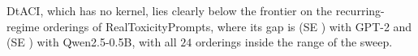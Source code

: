 DtACI, which has no kernel, lies clearly below the frontier on the recurring-regime orderings of RealToxicityPrompts, where its gap is \BwDtaciRecurGptTwo{} (SE \BwDtaciRecurGptTwoSE{}) with GPT-2 and \BwDtaciRecurQwen{} (SE \BwDtaciRecurQwenSE{}) with Qwen2.5-0.5B, with all $24$ orderings inside the range of the sweep.
